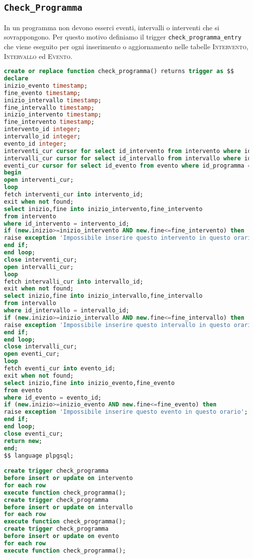 \subsection{\texttt{Check\_Programma}}
In un programma non devono esserci eventi, intervalli o interventi che si sovrappongono. Per questo motivo definiamo il trigger \texttt{check\_programma\_entry} che viene eseguito per ogni inserimento o aggiornamento nelle tabelle \textsc{Intervento}, \textsc{Intervallo} ed \textsc{Evento}.
\begin{lstlisting}[language=SQL,style=mystyle,caption={check\_programma\_entry}]
create or replace function check_programma() returns trigger as $$
declare
inizio_evento timestamp;
fine_evento timestamp;
inizio_intervallo timestamp;
fine_intervallo timestamp;
inizio_intervento timestamp;
fine_intervento timestamp;
intervento_id integer;
intervallo_id integer;
evento_id integer;
interventi_cur cursor for select id_intervento from intervento where id_programma = new.id_programma;
intervalli_cur cursor for select id_intervallo from intervallo where id_programma = new.id_programma;
eventi_cur cursor for select id_evento from evento where id_programma = new.id_programma;
begin
open interventi_cur;
loop 
fetch interventi_cur into intervento_id;
exit when not found;
select inizio,fine into inizio_intervento,fine_intervento
from intervento
where id_intervento = intervento_id;
if (new.inizio>=inizio_intervento AND new.fine<=fine_intervento) then
raise exception 'Impossibile inserire questo intervento in questo orario';
end if;
end loop;
close interventi_cur;
open intervalli_cur;
loop 
fetch intervalli_cur into intervallo_id;
exit when not found;
select inizio,fine into inizio_intervallo,fine_intervallo
from intervallo
where id_intervallo = intervallo_id;
if (new.inizio>=inizio_intervallo AND new.fine<=fine_intervallo) then
raise exception 'Impossibile inserire questo intervallo in questo orario';
end if;
end loop;
close intervalli_cur;
open eventi_cur;
loop 
fetch eventi_cur into evento_id;
exit when not found;
select inizio,fine into inizio_evento,fine_evento
from evento
where id_evento = evento_id;
if (new.inizio>=inizio_evento AND new.fine<=fine_evento) then
raise exception 'Impossibile inserire questo evento in questo orario';
end if;
end loop;
close eventi_cur;
return new;
end;
$$ language plpgsql;

create trigger check_programma
before insert or update on intervento
for each row
execute function check_programma();
create trigger check_programma
before insert or update on intervallo
for each row
execute function check_programma();
create trigger check_programma
before insert or update on evento
for each row
execute function check_programma();
\end{lstlisting}

